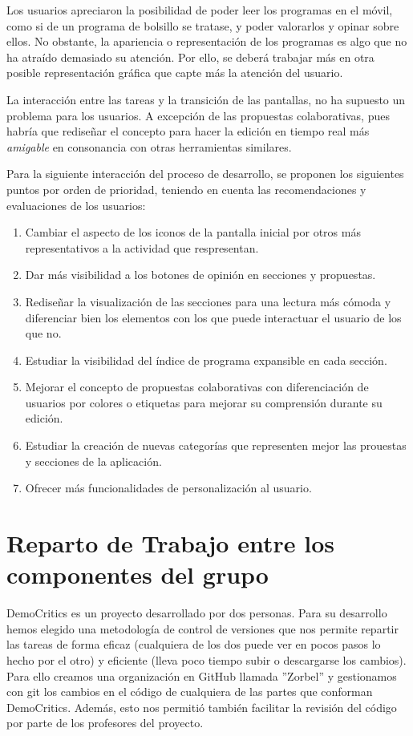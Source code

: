 Los usuarios apreciaron la posibilidad de poder leer los programas en el móvil, como si de un programa de bolsillo se tratase, y poder valorarlos y opinar sobre ellos. No obstante, la apariencia o representación de los programas es algo que no ha atraído demasiado su atención. Por ello, se deberá trabajar más en otra posible representación gráfica que capte más la atención del usuario.

La interacción entre las tareas y la transición de las pantallas, no ha supuesto un problema para los usuarios. A excepción de las propuestas colaborativas, pues habría que rediseñar el concepto para hacer la edición en tiempo real más \textit{amigable} en consonancia con otras herramientas similares.

Para la siguiente interacción del proceso de desarrollo, se proponen los siguientes puntos por orden de prioridad, teniendo en cuenta las recomendaciones y evaluaciones de los usuarios:

\begin{enumerate}
 \item Cambiar el aspecto de los iconos de la pantalla inicial por otros más representativos a la actividad que respresentan.
 \item Dar más visibilidad a los botones de opinión en secciones y propuestas.
 \item Rediseñar la visualización de las secciones para una lectura más cómoda y diferenciar bien los elementos con los que puede interactuar el usuario de los que no.
 \item Estudiar la visibilidad del índice de programa expansible en cada sección.
 \item Mejorar el concepto de propuestas colaborativas con diferenciación de usuarios por colores o etiquetas para mejorar su comprensión durante su edición.
 \item Estudiar la creación de nuevas categorías que representen mejor las prouestas y secciones de la aplicación.
 \item Ofrecer más funcionalidades de personalización al usuario.
\end{enumerate} 
 
\section{Reparto de Trabajo entre los componentes del grupo} 

DemoCritics es un proyecto desarrollado por dos personas. Para su desarrollo hemos elegido una metodología de control de versiones que nos permite repartir las tareas de forma eficaz (cualquiera de los dos puede ver en pocos pasos lo hecho por el otro) y eficiente (lleva poco tiempo subir o descargarse los cambios). Para ello creamos una organización en GitHub llamada ''Zorbel'' y gestionamos con git los cambios en el código de cualquiera de las partes que conforman DemoCritics. Además, esto nos permitió también facilitar la revisión del código por parte de los profesores del proyecto. 

